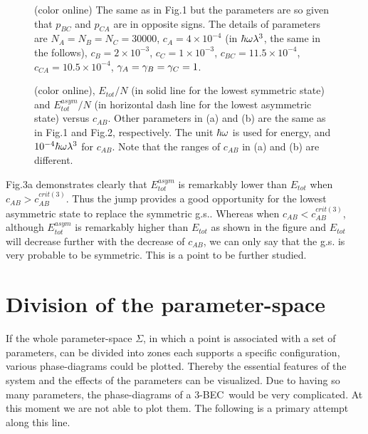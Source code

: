 \documentclass[single-column,showpacs,groupedaddress]{revtex4}
\begin{document}
\begin{figure}[tbp]
\centering {}
\caption{(color online) The same as in Fig.1 but the parameters are so given
that $p_{BC}$ and $p_{CA}$ are in opposite signs. The details of parameters
are $N_A=N_B=N_C=30000$, $c_A=4\times 10^{-4}$ (in $\hbar\protect\omega%
\protect\lambda^{3}$, the same in the follows), $c_B=2\times 10^{-3}$, $%
c_C=1\times 10^{-3}$, $c_{BC}=11.5\times 10^{-4}$, $c_{CA}=10.5\times
10^{-4} $, $\protect\gamma_A=\protect\gamma_B=\protect\gamma_C=1$.}
\label{Fig.2}
\end{figure}

\begin{figure}[tbp]
\centering {}
\caption{(color online), $E_{tot}/N$ (in solid line for the lowest symmetric
state) and $E_{tot}^{asym}/N$ (in horizontal dash line for the lowest
asymmetric state) versus $c_{AB}$. Other parameters in (a) and (b) are the
same as in Fig.1 and Fig.2, respectively. The unit $\hbar \protect\omega $
is used for energy, and $10^{-4}\hbar \protect\omega \protect\lambda ^{3}$
for $c_{AB}$. Note that the ranges of $c_{AB}$ in (a) and (b) are different.}
\label{Fig.3}
\end{figure}

Fig.3a demonstrates clearly that $E_{tot}^{asym}$ is remarkably lower than $%
E_{tot}$ when $c_{AB}>c_{AB}^{crit(3)}$. Thus the jump provides a good
opportunity for the lowest asymmetric state to replace the symmetric g.s..
Whereas when $c_{AB}<c_{AB}^{crit(3)}$, although $E_{tot}^{asym}$ is
remarkably higher than $E_{tot}$ as shown in the figure and $E_{tot}$ will
decrease further with the decrease of $c_{AB}$, we can only say that the
g.s. is very probable to be symmetric. This is a point to be further studied.

\section*{Division of the parameter-space}

If the whole parameter-space $\Sigma $, in which a point is associated with
a set of parameters, can be divided into zones each supports a specific
configuration, various phase-diagrams could be plotted. Thereby the
essential features of the system and the effects of the parameters can be
visualized. Due to having so many parameters, the phase-diagrams of a 3-BEC\
would be very complicated. At this moment we are not able to plot them. The
following is a primary attempt along this line.
\end{document}
